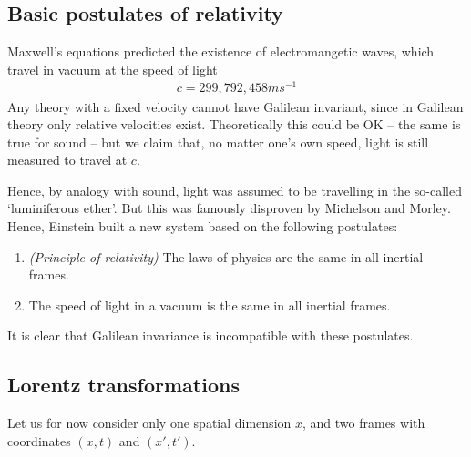 \documentclass{../../template/note}
\begin{document}
    \subsection{Basic postulates of relativity}

    Maxwell's equations predicted the existence of electromangetic waves, which travel in vacuum at the speed of light
    \begin{align*}
        c = 299,792,458 \si{ms^{-1}}
    \end{align*}
    Any theory with a fixed velocity cannot have Galilean invariant, since in Galilean theory only relative velocities exist. Theoretically this could be OK -- the same is true for sound -- but we claim that, no matter one's own speed, light is still measured to travel at \(c\).

    Hence, by analogy with sound, light was assumed to be travelling in the so-called `luminiferous ether'. But this was famously disproven by Michelson and Morley. Hence, Einstein built a new system based on the following postulates:
    \begin{enumerate}[label=\protect\circled{\arabic*}]
        \item \emph{(Principle of relativity)} The laws of physics are the same in all inertial frames.
        \item The speed of light in a vacuum is the same in all inertial frames.
    \end{enumerate}

    It is clear that Galilean invariance is incompatible with these postulates.

    \subsection{Lorentz transformations}

    Let us for now consider only one spatial dimension \(x\), and two frames with coordinates \((x, t)\) and \((x', t')\).
\end{document}
